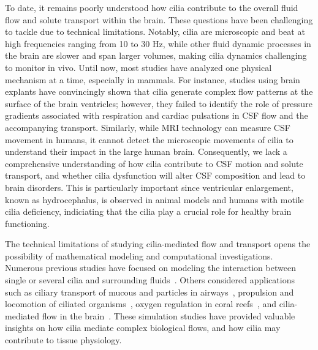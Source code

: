 \documentclass{WileyMSP-template}
\begin{document}
To date, it remains poorly understood how cilia contribute to the
overall fluid flow and solute transport within the brain.
These questions have been challenging to tackle due to technical
limitations. Notably, cilia are microscopic and beat at high
frequencies ranging from 10 to 30 Hz, while other fluid dynamic
processes in the brain are slower and span larger volumes, making
cilia dynamics challenging to monitor in vivo. Until now, most studies have
analyzed one physical mechanism at a time, especially in mammals.
For instance, studies using brain explants have convincingly shown
that cilia generate complex flow patterns at the surface of the brain
ventricles; however, they failed to identify the role of pressure
gradients associated with respiration and cardiac pulsations in CSF flow
and the accompanying transport. Similarly, while MRI technology can measure CSF movement
in humans, it cannot detect the microscopic movements of cilia to
understand their impact in the large human brain. Consequently, we
lack a comprehensive understanding of how cilia contribute to CSF
motion and solute transport, and whether cilia dysfunction will
alter CSF composition and lead to brain disorders. This is particularly
important since ventricular enlargement, known as hydrocephalus,
is observed in animal models and humans with motile cilia deficiency,
indiciating that the cilia play a crucial role for healthy brain functioning.

The technical limitations of studying cilia-mediated flow and transport opens the
possibility of mathematical modeling and computational investigations. Numerous previous studies
have focused on modeling the interaction between single or several cilia and surrounding
fluids~\cite{Guo2020SimulatingGeometries, Ruvalcaba2021NumericalTree, Smith2009MathematicalFluids,
Cui2019NumericalMethod, Cui2022AFlow}.
Others considered applications such as ciliary transport of mucous and particles in
airways~\cite{Fulford1986Muco-ciliaryLung, Ramirez-SanJuan2020Multi-scaleArrays},
propulsion and locomotion of ciliated organisms~\cite{BLAKE1974MechanicsMotion,
Jahn1972LocomotionProtozoa, Brennen1977FluidFlagella},
oxygen regulation in coral reefs~\cite{Pacherres2022CiliaryProduction},
and cilia-mediated flow in the brain~\cite{Siyahhan2014FlowVentricles,
Yoshida2022EffectVentricles, Salman2022ComputationalEmbryo, Thouvenin2020OriginCanal}.
These simulation studies have provided valuable insights on how cilia mediate complex
biological flows, and how cilia may contribute to tissue physiology.
\end{document}
